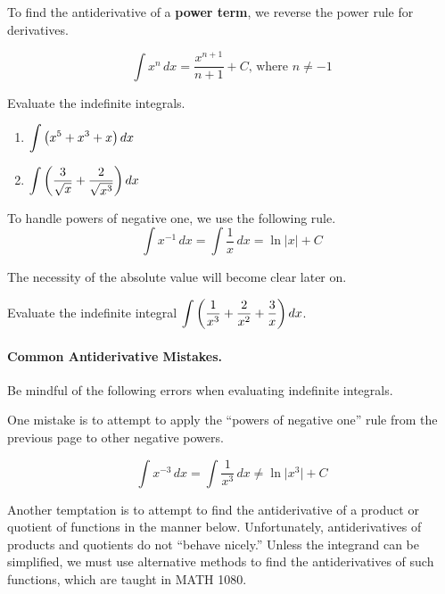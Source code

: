 \documentclass[12pt]{article}
\begin{document}
\vspace{5mm}

To find the antiderivative of a \textbf{power term}, we reverse the power rule for derivatives.

$$\int x^n\,dx=\frac{x^{n+1}}{n+1}+C\text{, where }n\neq -1$$

\vspace{5mm}

\Example Evaluate the indefinite integrals.

\begin{enumerate}
\item[\tc{1}] $\displaystyle\int \left( x^5+x^3+x\right) dx$

\vspace{30mm}

\item[\tc{2}] $\displaystyle\int\left( \frac{3}{\sqrt{x}}+\frac{2}{\sqrt{x^3}}\right) dx$

\vspace{30mm}
\end{enumerate}

To handle powers of negative one, we use the following rule.
$$\int x^{-1}\,dx=\int\frac{1}{x}\,dx=\ln|x|+C$$

\vspace{3mm}

The necessity of the absolute value will become clear later on.

\newpage

\Example Evaluate the indefinite integral $\displaystyle\int\left(\frac{1}{x^3}+\frac{2}{x^2}+\frac{3}{x}\right) dx$.

\vspace{30mm}

\paragraph{Common Antiderivative Mistakes.} Be mindful of the following errors when evaluating indefinite integrals.

\vspace{5mm}

One mistake is to attempt to apply the ``powers of negative one'' rule from the previous page to other negative powers.

$$\int x^{-3}\,dx=\int\frac{1}{x^3}\,dx\neq \ln\vert x^3\vert+C$$

\vspace{5mm}

Another temptation is to attempt to find the antiderivative of a product or quotient of functions in the manner below. Unfortunately, antiderivatives of products and quotients do not ``behave nicely.'' Unless the integrand can be simplified, we must use alternative methods to find the antiderivatives of such functions, which are taught in MATH 1080.
\end{document}
